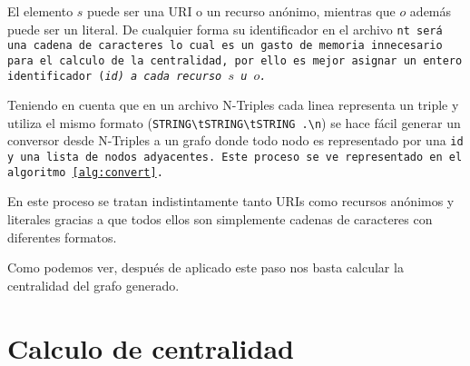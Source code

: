 El elemento $s$ puede ser una URI o un recurso anónimo, mientras que $o$ además
puede ser un literal. De cualquier forma su identificador en el archivo \tt{nt}
será una cadena de caracteres lo cual es un gasto de memoria innecesario para el
calculo de la centralidad, por ello es mejor asignar un entero identificador 
(\it{id}) a cada recurso $s$ u $o$.

Teniendo en cuenta que en un archivo N-Triples cada linea representa un triple y
utiliza el mismo formato (\verb$STRING\tSTRING\tSTRING .\n$) se hace fácil
generar un conversor desde N-Triples a un grafo donde todo nodo es representado
por una \tt{id} y una lista de nodos adyacentes. Este proceso se ve representado
en el algoritmo~\ref{alg:convert}.



En este proceso se tratan indistintamente tanto URIs como recursos anónimos y
literales gracias a que todos ellos son simplemente cadenas de caracteres con
diferentes formatos. 


Como podemos ver, después de aplicado este paso nos basta calcular la
centralidad del grafo generado.

\section{Calculo de centralidad}\label{d:cc}
